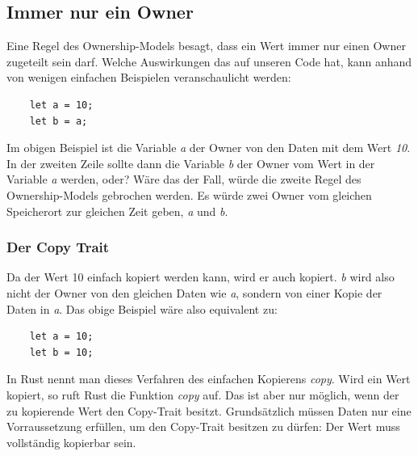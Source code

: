 \subsection{Immer nur ein Owner}
Eine Regel des Ownership-Models besagt, dass ein Wert immer nur einen Owner zugeteilt sein darf. Welche Auswirkungen das auf unseren Code hat, kann anhand
von wenigen einfachen Beispielen veranschaulicht werden:
\begin{lstlisting}
    let a = 10;
    let b = a;
\end{lstlisting}
Im obigen Beispiel ist die Variable \textit{a} der Owner von den Daten mit dem Wert \textit{10}. In der zweiten Zeile sollte dann die Variable \textit{b}
der Owner vom Wert in der Variable \textit{a} werden, oder? Wäre das der Fall, würde die zweite Regel des Ownership-Models gebrochen werden. Es würde zwei
Owner vom gleichen Speicherort zur gleichen Zeit geben, \textit{a} und \textit{b}.

\subsubsection{Der Copy Trait}
Da der Wert 10 einfach kopiert werden kann, wird er auch kopiert. \textit{b} wird also nicht der Owner von den gleichen Daten wie \textit{a}, sondern
von einer Kopie der Daten in \textit{a}. Das obige Beispiel wäre also equivalent zu:
\begin{lstlisting}
    let a = 10;
    let b = 10;
\end{lstlisting}
In Rust nennt man dieses Verfahren des einfachen Kopierens \textit{copy}. Wird ein Wert kopiert, so ruft Rust die Funktion \textit{copy} auf. Das
ist aber nur möglich, wenn der zu kopierende Wert den Copy-Trait besitzt. Grundsätzlich müssen Daten nur eine Vorraussetzung erfüllen, um den
Copy-Trait besitzen zu dürfen: Der Wert muss vollständig kopierbar sein.

